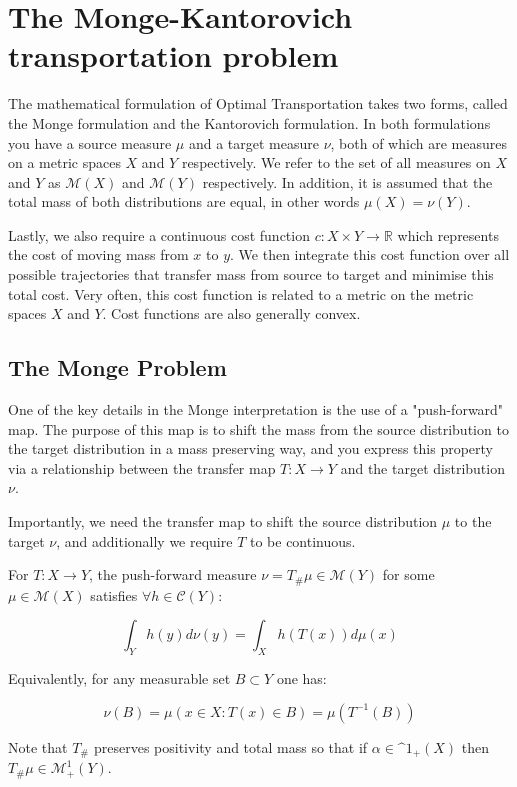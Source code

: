 
\section{The Monge-Kantorovich transportation problem}

The mathematical formulation of Optimal Transportation takes two forms, called the Monge formulation and the Kantorovich formulation. In both formulations you have a source measure $\mu$ and a target measure $\nu$, both of which are measures on a metric spaces $X$ and $Y$ respectively. We refer to the set of all measures on $X$ and $Y$ as $\mathcal{M}(X)$ and $\mathcal{M}(Y)$ respectively. In addition, it is assumed that the total mass of both distributions are equal, in other words $\mu(X) = \nu(Y)$.

Lastly, we also require a continuous cost function $c: X \times Y \rightarrow \mathbb{R}$ which represents the cost of moving mass from $x$ to $y$. We then integrate this cost function over all possible trajectories that transfer mass from source to target and minimise this total cost. Very often, this cost function is related to a metric on the metric spaces $X$ and $Y$. Cost functions are also generally convex.

\subsection{The Monge Problem}

One of the key details in the Monge interpretation is the use of a "push-forward" map. The purpose of this map is to shift the mass from the source distribution to the target distribution in a mass preserving way, and you express this property via a relationship between the transfer map $T: X \rightarrow Y$ and the target distribution $\nu$.

Importantly, we need the transfer map to shift the source distribution $\mu$ to the target $\nu$, and additionally we require $T$ to be continuous.

\begin{definition}
For $T: X \rightarrow Y$, the push-forward measure $\nu = T_{\#}\mu \in \mathcal{M}(Y)$ for some $\mu \in \mathcal{M}(X)$ satisfies $\forall h \in \mathcal{C}(Y)$:

$$\int_Y h(y) d \nu(y) = \int_X h(T(x)) d\mu(x)$$

Equivalently, for any measurable set $B \subset Y$ one has:

$$\nu(B) = \mu({x \in X: T(x) \in B}) = \mu(T^{-1}(B))$$

Note that $T_{\#}$ preserves positivity and total mass so that if $\alpha \in \mathcal^{1}_{+}(X)$ then $T_{\#}\mu \in \mathcal{M}_{+}^{1} (Y)$.

\end{definition}

